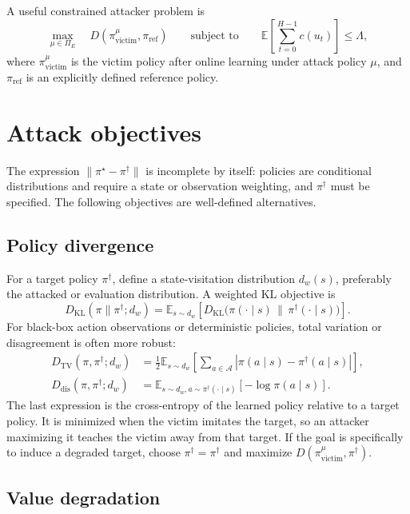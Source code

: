 \documentclass[11pt]{article}
\newcommand{\A}{\mathcal{A}}
\newcommand{\Eexp}{\mathbb{E}}
\newcommand{\KL}{D_{\mathrm{KL}}}
\newcommand{\piopt}{\pi^{\star}}
\newcommand{\pitar}{\pi^{\dagger}}
\begin{document}
A useful constrained attacker problem is
\[
 \max_{\mu\in\Pi_E}
 \quad D\!\left(\pi_{\mathrm{victim}}^{\mu},\pi_{\mathrm{ref}}\right)
 \qquad
 \text{subject to}\qquad
 \Eexp\left[\sum_{t=0}^{H-1}c(u_t)\right]\leq\Lambda,
\]
where $\pi_{\mathrm{victim}}^{\mu}$ is the victim policy after online learning under attack policy $\mu$, and $\pi_{\mathrm{ref}}$ is an explicitly defined reference policy.

\section{Attack objectives}

The expression $\lVert\piopt-\pitar\rVert$ is incomplete by itself: policies are conditional distributions and require a state or observation weighting, and $\pitar$ must be specified. The following objectives are well-defined alternatives.

\subsection{Policy divergence}

For a target policy $\pitar$, define a state-visitation distribution $d_w(s)$, preferably the attacked or evaluation distribution. A weighted KL objective is
\[
 D_{\mathrm{KL}}(\pi\|\pitar;d_w)
 = \Eexp_{s\sim d_w}\left[
    \KL\bigl(\pi(\cdot\mid s)\,\|\,\pitar(\cdot\mid s)\bigr)
   \right].
\]
For black-box action observations or deterministic policies, total variation or disagreement is often more robust:
\begin{align}
 D_{\mathrm{TV}}(\pi,\pitar;d_w)
 &= \frac{1}{2}\Eexp_{s\sim d_w}
    \left[\sum_{a\in\A}|\pi(a\mid s)-\pitar(a\mid s)|\right],\\
 D_{\mathrm{dis}}(\pi,\pitar;d_w)
 &= \Eexp_{s\sim d_w,a\sim\pitar(\cdot\mid s)}
    [-\log \pi(a\mid s)].
\end{align}
The last expression is the cross-entropy of the learned policy relative to a target policy. It is minimized when the victim imitates the target, so an attacker maximizing it teaches the victim away from that target. If the goal is specifically to induce a degraded target, choose $\pitar=\pi^{\dagger}$ and maximize $D(\pi_{\mathrm{victim}}^{\mu},\pi^{\dagger})$.

\subsection{Value degradation}
\end{document}
